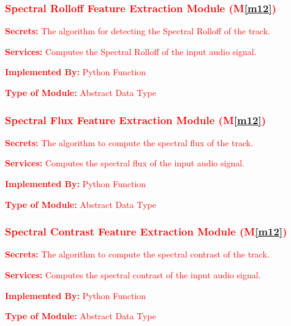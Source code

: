 \documentclass[12pt, titlepage]{article}
\newcommand{\mref}[1]{M\ref{#1}}
\begin{document}
\subsubsection{\textcolor{red}{Spectral Rolloff Feature Extraction Module (\mref{m12})}}

\begin{description}
\item \textcolor{red}{\textbf{Secrets:} The algorithm for detecting the Spectral Rolloff of the track.}
\item \textcolor{red}{\textbf{Services:} Computes the Spectral Rolloff of the input audio signal.}
\item \textcolor{red}{\textbf{Implemented By:} Python Function}
\item \textcolor{red}{\textbf{Type of Module:} Abstract Data Type}
\end{description}

\subsubsection{\textcolor{red}{Spectral Flux Feature Extraction Module (\mref{m12})}}

\begin{description}
\item \textcolor{red}{\textbf{Secrets:} The algorithm to compute the spectral flux of the track.}
\item \textcolor{red}{\textbf{Services:} Computes the spectral flux of the input audio signal.}
\item \textcolor{red}{\textbf{Implemented By:} Python Function}
\item \textcolor{red}{\textbf{Type of Module:} Abstract Data Type}
\end{description}

\subsubsection{\textcolor{red}{Spectral Contrast Feature Extraction Module (\mref{m12})}}

\begin{description}
\item \textcolor{red}{\textbf{Secrets:} The algorithm to compute the spectral contrast of the track.}
\item \textcolor{red}{\textbf{Services:} Computes the spectral contrast of the input audio signal.}
\item \textcolor{red}{\textbf{Implemented By:} Python Function}
\item \textcolor{red}{\textbf{Type of Module:} Abstract Data Type}
\end{description}
\end{document}
